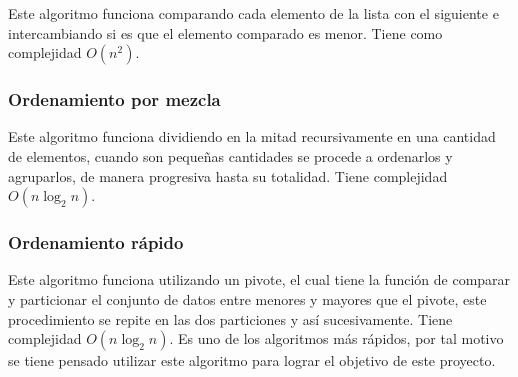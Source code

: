 \documentclass[final,a4paper,romanappendices]{IEEEtran}\usepackage[]{graphicx}\usepackage[]{color}
\theoremstyle{definition}
\begin{document}
Este algoritmo funciona comparando cada elemento de la lista con el siguiente e intercambiando si es que el elemento comparado es menor. Tiene como complejidad $O(n^2)$.

\subsubsection{Ordenamiento por mezcla}

Este algoritmo funciona dividiendo en la mitad recursivamente en una cantidad de elementos, cuando son pequeñas cantidades se procede a ordenarlos y agruparlos, de manera progresiva hasta su totalidad. Tiene complejidad $O(n\log_{2} n)$.

\subsubsection{Ordenamiento rápido}

Este algoritmo funciona utilizando un pivote, el cual tiene la función de comparar y particionar el conjunto de datos entre menores y mayores que el pivote, este procedimiento se repite en las dos particiones y así sucesivamente. Tiene complejidad $O(n\log_{2} n)$. Es uno de los algoritmos más rápidos, por tal motivo se tiene pensado utilizar este algoritmo para lograr el objetivo de este proyecto.
\end{document}
